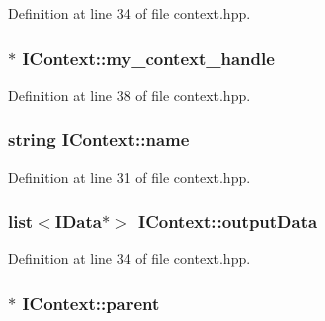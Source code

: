 Definition at line 34 of file context.hpp.\hypertarget{class_i_context_a9eb34b3b3544c4186cce3296d444a9ac}{
\subsubsection[{my\_\-context\_\-handle}]{$\ast$ {\bf IContext::my\_\-context\_\-handle}}}
\label{class_i_context_a9eb34b3b3544c4186cce3296d444a9ac}


Definition at line 38 of file context.hpp.\hypertarget{class_i_context_ae92fa26bc80aa6759c7410c2f933c68b}{
\subsubsection[{name}]{\setlength{\rightskip}{0pt plus 5cm}string {\bf IContext::name}}}
\label{class_i_context_ae92fa26bc80aa6759c7410c2f933c68b}


Definition at line 31 of file context.hpp.\hypertarget{class_i_context_a7a37d0f4ea08c03624d14ae2860f077f}{
\subsubsection[{outputData}]{\setlength{\rightskip}{0pt plus 5cm}list$<${\bf IData}$\ast$$>$ {\bf IContext::outputData}}}
\label{class_i_context_a7a37d0f4ea08c03624d14ae2860f077f}


Definition at line 34 of file context.hpp.\hypertarget{class_i_context_aa97a20f038e5c3053c94f1a70779a0f1}{
\subsubsection[{parent}]{$\ast$ {\bf IContext::parent}}}
\label{class_i_context_aa97a20f038e5c3053c94f1a70779a0f1}


